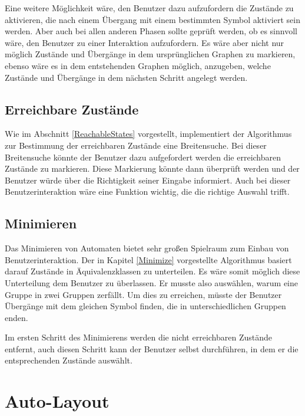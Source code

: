 Eine weitere Möglichkeit wäre, den Benutzer dazu aufzufordern die Zustände zu
aktivieren, die nach einem Übergang mit einem bestimmten Symbol aktiviert sein
werden. Aber auch bei allen anderen Phasen sollte geprüft werden, ob es sinnvoll
wäre, den Benutzer zu einer Interaktion aufzufordern. Es wäre aber nicht nur
möglich Zustände und Übergänge in dem ursprünglichen Graphen zu markieren, ebenso
wäre es in dem entstehenden Graphen möglich, anzugeben, welche Zustände und
Übergänge in dem nächsten Schritt angelegt werden.\vspace{10pt}


\subsection{Erreichbare Zustände}
Wie im Abschnitt \ref{ReachableStates} vorgestellt, implementiert der
Algorithmus zur Bestimmung der erreichbaren Zustände eine Breitensuche. Bei
dieser Breitensuche könnte der Benutzer dazu aufgefordert werden die
erreichbaren Zustände zu markieren. Diese Markierung könnte dann überprüft
werden und der Benutzer würde über die Richtigkeit seiner Eingabe informiert.
Auch bei dieser Benutzerinteraktion wäre eine Funktion wichtig, die die
richtige Auswahl trifft.\vspace{10pt}


\subsection{Minimieren}
Das Minimieren von Automaten bietet sehr großen Spielraum zum Einbau von
Benutzerinteraktion. Der in Kapitel \ref{Minimize} vorgestellte Algorithmus
basiert darauf Zustände in Äquivalenz\-klassen zu unterteilen. Es wäre somit
möglich diese Unterteilung dem Benutzer zu überlassen. Er musste also
auswählen, warum eine Gruppe in zwei Gruppen zerfällt. Um dies zu erreichen,
müsste der Benutzer Übergänge mit dem gleichen Symbol finden, die in
unterschiedlichen Gruppen enden.\vspace{10pt}

Im ersten Schritt des Minimierens werden die nicht erreichbaren Zustände
entfernt, auch diesen Schritt kann der Benutzer selbst durchführen, in dem er die
entsprechenden Zustände auswählt.\vspace{10pt}


\section{Auto-Layout}\label{PerspectiveAutoLayout}

